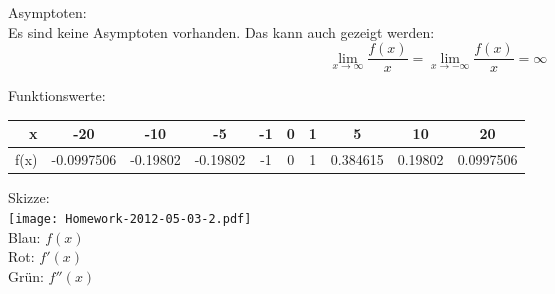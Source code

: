 \documentclass[a4paper]{scrartcl}
\begin{document}
\begin{enumerate}
Asymptoten:\\
Es sind keine Asymptoten vorhanden. Das kann auch gezeigt werden:
\[\lim_{x \to \infty} \frac {f(x)} x = \lim_{x \to -\infty} \frac {f(x)} x = \infty\]

Funktionswerte:\\
\begin{tabular}{r|c|c|c|c|c|c|c|c|c}
x & -20 & -10 & -5 & -1 & 0 & 1 & 5 & 10 & 20\\
\hline
f(x) & -0.0997506 & -0.19802 & -0.19802 & -1 & 0 & 1 & 0.384615 & 0.19802 & 0.0997506
\end{tabular}

Skizze:\\
\hspace*{-1.5in}
\texttt{[image: Homework-2012-05-03-2.pdf]}\\
Blau: \(f(x)\)\\
Rot: \(f'(x)\)\\
Grün: \(f''(x)\)

\end{enumerate}
\end{document}

